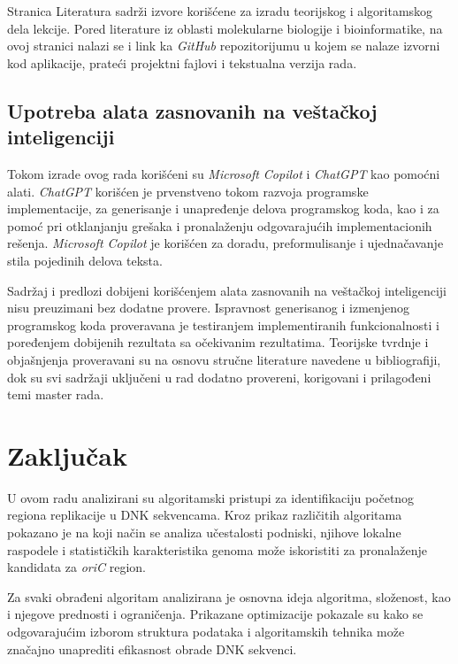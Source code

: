 \documentclass[12pt,oneside]{memoir}
\begin{document}
Stranica Literatura sadrži izvore korišćene za izradu teorijskog i algoritamskog dela lekcije. Pored literature iz oblasti molekularne biologije i bioinformatike, na ovoj stranici nalazi se i link ka \textit{GitHub} repozitorijumu u kojem se nalaze izvorni kod aplikacije, prateći projektni fajlovi i tekstualna verzija rada.


\section{Upotreba alata zasnovanih na veštačkoj inteligenciji}

Tokom izrade ovog rada korišćeni su \textit{Microsoft Copilot} i \textit{ChatGPT} kao pomoćni alati. 
\textit{ChatGPT} korišćen je prvenstveno tokom razvoja programske implementacije, 
za generisanje i unapređenje delova programskog koda, kao i za pomoć pri 
otklanjanju grešaka i pronalaženju odgovarajućih implementacionih rešenja. 
\textit{Microsoft Copilot} je korišćen za doradu, preformulisanje i ujednačavanje stila pojedinih delova teksta.

Sadržaj i predlozi dobijeni korišćenjem alata zasnovanih na veštačkoj inteligenciji nisu preuzimani bez dodatne provere. Ispravnost generisanog i izmenjenog programskog koda proveravana je testiranjem implementiranih funkcionalnosti i poređenjem dobijenih rezultata sa očekivanim rezultatima. Teorijske tvrdnje i objašnjenja proveravani su na osnovu stručne literature navedene u bibliografiji, dok su svi sadržaji uključeni u rad dodatno provereni, korigovani i prilagođeni temi master rada.

\chapter{Zaključak}

U ovom radu analizirani su algoritamski pristupi za identifikaciju početnog regiona replikacije u DNK sekvencama. Kroz prikaz različitih algoritama pokazano je na koji način se analiza učestalosti podniski, njihove lokalne raspodele i statističkih karakteristika genoma može iskoristiti za pronalaženje kandidata za \textit{oriC} region.

Za svaki obrađeni algoritam analizirana je osnovna ideja algoritma, složenost, kao i njegove prednosti i ograničenja. Prikazane optimizacije pokazale su kako se odgovarajućim izborom struktura podataka i algoritamskih tehnika može značajno unaprediti efikasnost obrade DNK sekvenci.
\end{document}
